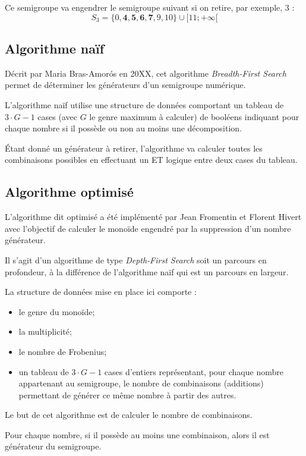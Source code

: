 \documentclass[12pt,a4paper]{article}
\begin{document}
Ce semigroupe va engendrer le semigroupe suivant si on retire, par exemple, 3 :
\[ S_3 = \{ 0, \mathbf{4}, \mathbf{5}, \mathbf{6}, \mathbf{7}, 9, 10 \} \cup [11; +\infty[ \]

\subsection*{Algorithme naïf}
Décrit par Maria Bras-Amorós en 20XX, cet algorithme \emph{Breadth-First Search} permet de déterminer les générateurs d'un semigroupe numérique.

L'algorithme naïf utilise une structure de données comportant un tableau de $3 \cdot G - 1$ cases (avec $G$ le genre maximum à calculer) de booléens indiquant pour chaque nombre si il possède ou non au moins une décomposition.

Étant donné un générateur à retirer, l'algorithme va calculer toutes les combinaisons possibles en effectuant un ET logique entre deux cases du tableau.

\subsection*{Algorithme optimisé}

L'algorithme dit optimisé a été implémenté par Jean Fromentin et Florent Hivert avec l'objectif de calculer le monoïde engendré par la suppression d'un nombre générateur.

Il s'agit d'un algorithme de type \emph{Depth-First Search} soit un parcours en profondeur, à la différence de l'algorithme naïf qui est un parcours en largeur.

La structure de données mise en place ici comporte :
\begin{itemize}
	\item	le genre du monoïde;
	\item	la multiplicité;
	\item	le nombre de Frobenius;
	\item	un tableau de $3 \cdot G - 1$ cases d'entiers représentant, pour chaque nombre appartenant au semigroupe, le nombre de combinaisons (additions) permettant de générer ce même nombre à partir des autres.
\end{itemize}

Le but de cet algorithme est de calculer le nombre de combinaisons.

Pour chaque nombre, si il possède au moins une combinaison, alors il est générateur du semigroupe.
\end{document}
